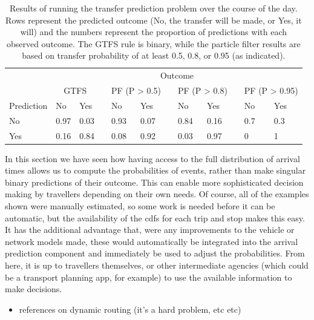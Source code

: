 \begin{knitrout}\small
{}\color{fgcolor}\begin{table}

\caption{\label{tab:eta_journey_transfer_many2}Results of running the transfer prediction problem over the course of the day. Rows represent the predicted outcome (No, the transfer will be made, or Yes, it will) and the numbers represent the proportion of predictions with each observed outcome. The GTFS rule is binary, while the particle filter results are based on transfer probability of at least 0.5, 0.8, or 0.95 (as indicated).}
\centering
\fontsize{8}{10}\selectfont
\begin{tabular}[t]{llllllllllll}
\toprule
\multicolumn{1}{c}{} & \multicolumn{11}{c}{Outcome} \\
\cmidrule(l{3pt}r{3pt}){2-12}
\multicolumn{1}{c}{} & \multicolumn{2}{c}{GTFS} & \multicolumn{1}{c}{} & \multicolumn{2}{c}{PF (P > 0.5)} & \multicolumn{1}{c}{} & \multicolumn{2}{c}{PF (P > 0.8)} & \multicolumn{1}{c}{} & \multicolumn{2}{c}{PF (P > 0.95)} \\
\cmidrule(l{3pt}r{3pt}){2-3} \cmidrule(l{3pt}r{3pt}){5-6} \cmidrule(l{3pt}r{3pt}){8-9} \cmidrule(l{3pt}r{3pt}){11-12}
Prediction & No & Yes &  & No & Yes &  & No & Yes &  & No & Yes\\
\midrule
No & 0.97 & 0.03 &  & 0.93 & 0.07 &  & 0.84 & 0.16 &  & 0.7 & 0.3\\
Yes & 0.16 & 0.84 &  & 0.08 & 0.92 &  & 0.03 & 0.97 &  & 0 & 1\\
\bottomrule
\end{tabular}
\end{table}


\end{knitrout}



In this section we have seen how having access to the full distribution of arrival times allows us to compute the probabilities of events, rather than make singular binary predictions of their outcome. This can enable more sophisticated decision making by travellers depending on their own needs. Of course, all of the examples shown were manually estimated, so some work is needed before it can be automatic, but the availability of the \glspl{cdf} for each trip and stop makes this easy. It has the additional advantage that, were any improvements to the vehicle or network models made, these would automatically be integrated into the arrival prediction component and immediately be used to adjust the probabilities. From here, it is up to travellers themselves, or other intermediate agencies (which could be a transport planning app, for example) to use the available information to make decisions.

\begin{itemize}
\item references on dynamic routing (it's a hard problem, etc etc)
\end{itemize}
